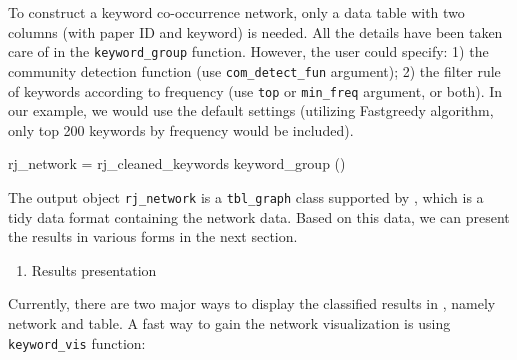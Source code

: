 To construct a keyword co-occurrence network, only a data table with two
columns (with paper ID and keyword) is needed. All the details have been
taken care of in the \texttt{keyword\_group} function. However, the user
could specify: 1) the community detection function (use
\texttt{com\_detect\_fun} argument); 2) the filter rule of keywords
according to frequency (use \texttt{top} or \texttt{min\_freq} argument,
or both). In our example, we would use the default settings (utilizing
Fastgreedy algorithm, only top 200 keywords by frequency would be
included).

\begin{Schunk}
\begin{Sinput}
rj_network = rj_cleaned_keywords %
  keyword_group ()
\end{Sinput}
\end{Schunk}

The output object \texttt{rj\_network} is a \texttt{tbl\_graph} class
supported by , which is a tidy data format containing
the network data. Based on this data, we can present the results in
various forms in the next section.

\begin{enumerate}
\def\labelenumi{(\arabic{enumi})}
\setcounter{enumi}{3}
\tightlist
\item
  Results presentation
\end{enumerate}

Currently, there are two major ways to display the classified results in
, namely network and table. A fast way to gain the network
visualization is using \texttt{keyword\_vis} function:

